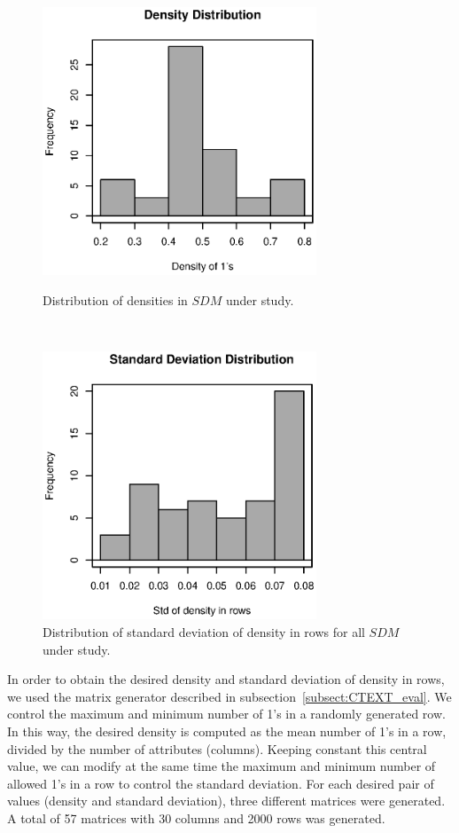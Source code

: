 \documentclass[authoryear,11pt]{elsarticle}
\begin{document}
	\begin{figure}[htb]
	\begin{minipage}{.5\textwidth}
	    \begin{center}
	       \includegraphics[height=8cm]{density_freq.eps}
	    \end{center}
	\caption{Distribution of densities in $SDM$ under study.}
	\label{fig:density}
	~
	\end{minipage}%
	\begin{minipage}{.5\textwidth}
	    \begin{center}
	       \includegraphics[height=8cm]{std_freq.eps}
	    \end{center}
	\caption{Distribution of standard deviation of density in rows for all $SDM$ under study.}
	\label{fig:std}
	\end{minipage}	
	\end{figure}		
	
	In order to obtain the desired density and standard deviation of density in rows, we used the 
	matrix generator described in subsection~\ref{subsect:CTEXT_eval}. We control the maximum and
	minimum number of 1's in a randomly generated row. In this way, the desired density is computed
	as the mean number of 1's in a row, divided by the number of attributes (columns). Keeping 
	constant this central value, we can modify at the same time the maximum and minimum number of
	allowed 1's in a row to control the standard deviation. For each desired pair of values (density 
	and standard deviation), three different matrices were generated. A total of 57 matrices with
	30 columns and 2000 rows was generated.
	
\end{document}
